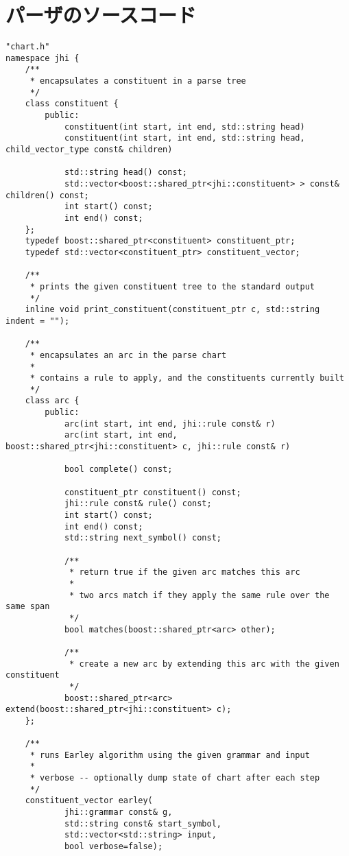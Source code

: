 \documentclass[11pt,a4paper]{jsarticle}
\begin{document}
\section*{パーザのソースコード}
{\small %
\begin{verbatim}
"chart.h"
namespace jhi {
    /**
     * encapsulates a constituent in a parse tree
     */
    class constituent {
        public:
            constituent(int start, int end, std::string head)
            constituent(int start, int end, std::string head, child_vector_type const& children)

            std::string head() const;
            std::vector<boost::shared_ptr<jhi::constituent> > const& children() const;
            int start() const;
            int end() const;
    };
    typedef boost::shared_ptr<constituent> constituent_ptr;
    typedef std::vector<constituent_ptr> constituent_vector;

    /**
     * prints the given constituent tree to the standard output
     */
    inline void print_constituent(constituent_ptr c, std::string indent = "");

    /**
     * encapsulates an arc in the parse chart
     *
     * contains a rule to apply, and the constituents currently built
     */
    class arc {
        public:
            arc(int start, int end, jhi::rule const& r)
            arc(int start, int end, boost::shared_ptr<jhi::constituent> c, jhi::rule const& r)

            bool complete() const;

            constituent_ptr constituent() const;
            jhi::rule const& rule() const;
            int start() const;
            int end() const;
            std::string next_symbol() const;

            /**
             * return true if the given arc matches this arc
             *
             * two arcs match if they apply the same rule over the same span
             */
            bool matches(boost::shared_ptr<arc> other);

            /**
             * create a new arc by extending this arc with the given constituent
             */
            boost::shared_ptr<arc> extend(boost::shared_ptr<jhi::constituent> c);
    };

    /**
     * runs Earley algorithm using the given grammar and input
     *
     * verbose -- optionally dump state of chart after each step
     */
    constituent_vector earley(
            jhi::grammar const& g,
            std::string const& start_symbol,
            std::vector<std::string> input,
            bool verbose=false);


\end{verbatim}}
\end{document}
